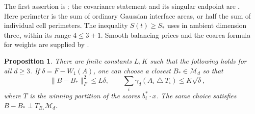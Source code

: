 \documentclass[11pt,reqno]{amsart}
\newtheorem{proposition}[theorem]{Proposition}
\theoremstyle{remark}
\newcommand{\norm}[1]{\lVert #1\rVert}
\newcommand{\ga}{\gamma}
\begin{document}
The first assertion is \cite[Theorem~1]{Zhang}; the covariance statement
and its singular endpoint are \cite[Sections~2--4, equations~(13)--(14)]{Zhang}.
Here perimeter is the sum of ordinary Gaussian interface areas, or half
the sum of individual cell perimeters. The inequality $S(t)\ge S_*$
uses \cite[Theorem~1.1]{MN} in ambient dimension three, within its range
$4\le3+1$. Smooth balancing prices and the coarea formula for weights
are supplied by \cite[Lemma~2]{Zhang}.

\begin{proposition}\label{prop:alignment}
There are finite constants $L,K$ such that the following holds for all
$d\ge3$. If $\delta=F-W_1(A)$, one can choose a closest
$B_*\in\mathcal M_d$ so that
\begin{equation}\label{eq:alignment}
 \norm{B-B_*}_F^2\le L\delta,
 \qquad
 \sum_i\ga_d(A_i\mathbin\triangle T_i)\le K\sqrt\delta,
\end{equation}
where $T$ is the winning partition of the scores $b_i^*\cdot x$.
The same choice satisfies $B-B_*\perp T_{B_*}\mathcal M_d$.
\end{proposition}
\end{document}
